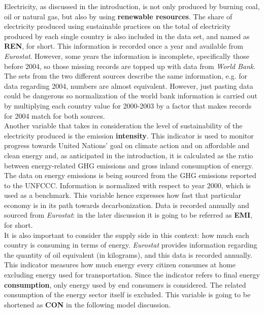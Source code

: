 \documentclass[a4paper,12pt]{book}
\begin{document}
Electricity, as discussed in the introduction, is not only produced by burning coal, oil or natural gas, but also by using \textbf{renewable resources}. The share of electricity produced using sustainable practices on the total of electricity produced by each single country is also included in the data set, and named as \textbf{REN}, for short. This information is recorded once a year and available from \textit{Eurostat}. However, some years the information is incomplete, specifically those before 2004, so those missing records are topped up with data from \textit{World Bank}. The sets from the two different sources describe the same information, e.g. for data regarding 2004, numbers are almost equivalent. However, just pasting data could be dangerous so normalization of the world bank information is carried out by multiplying each country value for 2000-2003 by a factor that makes records for 2004 match for both sources. \\

Another variable that takes in consideration the level of sustainability of the electricity produced is the emission \textbf{intensity}. This indicator is used to monitor progress towards United Nations' goal on climate action and on affordable and clean energy and, as anticipated in the introduction, it is calculated as the ratio between energy-related GHG emissions and gross inland consumption of energy. The data on energy emissions is being sourced from the GHG emissions reported to the UNFCCC. Information is normalized with respect to year 2000, which is used as a benchmark. This variable hence expresses how fast that particular economy is in its path towards decarbonization. Data is recorded annually and sourced from \textit{Eurostat}: in the later discussion it is going to be referred as \textbf{EMI}, for short.\\

It is also important to consider the supply side in this context: how much each country is consuming in terms of energy. \textit{Eurostat} provides information regarding the quantity of oil equivalent (in kilograms), and this data is recorded annually. This indicator measures how much energy every citizen consumes at home excluding energy used for transportation. Since the indicator refers to final energy \textbf{consumption}, only energy used by end consumers is considered. The related consumption of the energy sector itself is excluded. This variable is going to be shortened as \textbf{CON} in the following model discussion.\\
\end{document}
